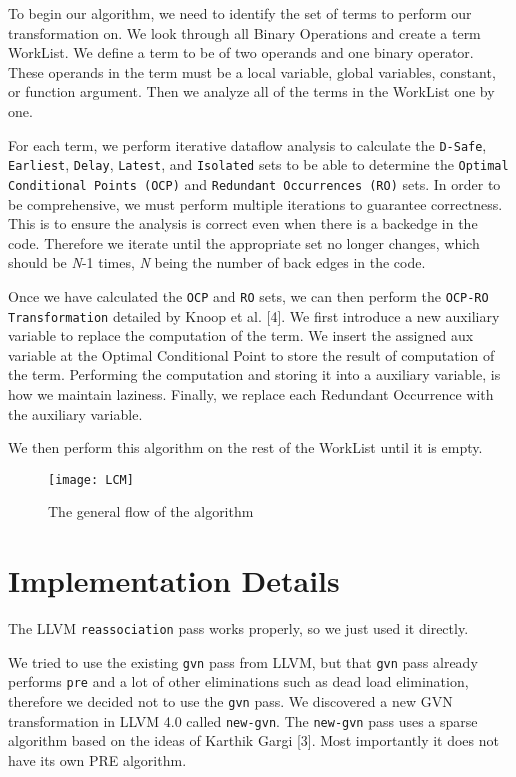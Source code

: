 \documentclass[onecolumn,10pt]{journal}
\begin{document}
    To begin our algorithm, we need to identify the set of terms to perform our transformation on. We look through all Binary Operations and create a term WorkList. We define a term to be of two operands and one binary operator. These operands in the term must be a local variable, global variables, constant, or function argument. Then we analyze all of the terms in the WorkList one by one. 

    For each term, we perform iterative dataflow analysis to calculate the \texttt{D-Safe}, \texttt{Earliest}, \texttt{Delay}, \texttt{Latest}, and \texttt{Isolated} sets to be able to determine the \texttt{Optimal Conditional Points (OCP)} and \texttt{Redundant Occurrences (RO)} sets. In order to be comprehensive, we must perform multiple iterations to guarantee correctness. This is to ensure the analysis is correct even when there is a backedge in the code. Therefore we iterate until the appropriate set no longer changes, which should be \textit{N}-1 times, \textit{N} being the number of back edges in the code. 

    Once we have calculated the \texttt{OCP} and \texttt{RO} sets, we can then perform the \texttt{OCP-RO Transformation} detailed by Knoop et al. [4]. We first introduce a new auxiliary variable to replace the computation of the term. We insert the assigned aux variable at the Optimal Conditional Point to store the result of computation of the term. Performing the computation and storing it into a auxiliary variable, is how we maintain laziness. Finally, we replace each Redundant Occurrence with the auxiliary variable.
    
    We then perform this algorithm on the rest of the WorkList until it is empty.
\begin{figure}[!b] 
\texttt{[image: LCM]}
\caption{The general flow of the algorithm}
\end{figure}

\pagebreak

\section{Implementation Details}
The LLVM \texttt{reassociation} pass works properly, so we just used it directly.  

We tried to use the existing \texttt{gvn} pass from LLVM, but that \texttt{gvn} pass already performs \texttt{pre} and a lot of other eliminations such as dead load elimination, therefore we decided not to use the \texttt{gvn} pass. We discovered a new GVN transformation in LLVM 4.0 called \texttt{new-gvn}. The \texttt{new-gvn} pass uses a sparse algorithm based on the ideas of Karthik Gargi [3]. Most importantly it does not have its own PRE algorithm.
\end{document}
